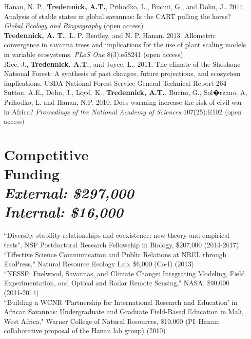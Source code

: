\documentclass[margin,line]{resume}
\begin{document}
\begin{resume}
	Hanan, N. P., \textbf{Tredennick, A.T.}, Prihodko, L., Bucini, G., and Dohn, J.. 2014. Analysis of stable states in global savannas: Is the CART pulling the horse? 	\textsl{Global Ecology and Biogeography} (open access)\vspace{-6mm}\\%
	
	\textbf{Tredennick, A. T.}, L. P. Bentley, and N. P. Hanan. 2013. Allometric convergence in savanna trees and implications for the use of plant scaling models in 	variable ecosystems. \textsl{PLoS One} 8(3):e58241 (open access)\vspace{-6mm}\\%
	
	Rice, J., \textbf{Tredennick, A.T.}, and Joyce, L.. 2011. The climate of the Shoshone National Forest: A synthesis of past changes, future projections, and 			ecosystem implications. USDA National Forest Service General Technical Report 264 \vspace{-6mm}\\%
	
	Sutton, A.E., Dohn, J., Loyd, K., \textbf{Tredennick, A.T.}, Bucini, G., Sol�rzano, A, Prihodko, L. and Hanan, N.P. 2010. Does warming increase the risk of civil war 	in Africa? \textsl{Proceedings of the National Academy of Sciences} 107(25):E102 (open access) %
  
    \newpage
    \section{\mysidestyle Competitive\\Funding\\\textsl{\footnotesize External: \$297,000}\\\textsl{\footnotesize Internal: \$16,000}}
    ``Diversity-stability relationships and coexistence: new theory and empirical tests", NSF Postdoctoral Research Fellowship in Biology, \$207,000 (2014-2017)\vspace{2mm}\\%
    ``Effective Science Communication and Public Relations at NREL through EcoPress," Natural Resource Ecology Lab, \$6,000 (Co-I) (2013) \vspace{2mm}\\%
    ``NESSF: Fuelwood, Savannas, and Climate Change: Integrating Modeling, Field Experimentation, and Optical and Radar Remote Sensing," NASA, \$90,000 (2011-2014) \vspace{2mm}\\%
    ``Building a WCNR `Partnership for International Research and Education' in African Savannas: Undergraduate and Graduate Field-Based Education in Mali, West Africa," Warner College of Natural Resources, \$10,000 (PI--Hanan; collaborative proposal of the Hanan lab group) (2010)%
    

\end{resume}
\end{document}
